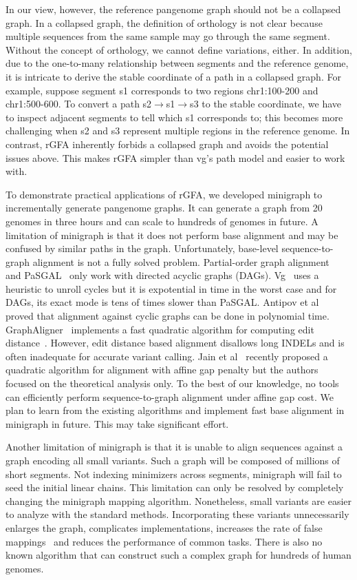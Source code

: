 \documentclass[twocolumn]{bmcart}
\begin{document}
In our view, however, the reference pangenome graph should not be a collapsed
graph. In a collapsed graph, the definition of orthology is not clear because
multiple sequences from the same sample may go through the same segment.
Without the concept of orthology, we cannot define variations, either.  In
addition, due to the one-to-many relationship between segments and the
reference genome, it is intricate to derive the stable coordinate of a path in
a collapsed graph. For example, suppose segment {\sf s1} corresponds to two
regions {\sf chr1:100-200} and {\sf chr1:500-600}. To convert a path {\sf
s2$\to$s1$\to$s3} to the stable coordinate, we have to inspect adjacent
segments to tell which {\sf s1} corresponds to; this becomes more challenging
when {\sf s2} and {\sf s3} represent multiple regions in the reference genome.
In contrast, rGFA inherently forbids a collapsed graph and avoids the potential
issues above. This makes rGFA simpler than vg's path model and easier to work
with.

To demonstrate practical applications of rGFA, we developed minigraph to
incrementally generate pangenome graphs. It can generate a graph from 20
genomes in three hours and can scale to hundreds of genomes in future. A
limitation of minigraph is that it does not perform base alignment and may be
confused by similar paths in the graph. {\color{black} Unfortunately, base-level
sequence-to-graph alignment is not a fully solved problem. Partial-order graph
alignment~\cite{Lee_2002} and PaSGAL~\cite{DBLP:conf/ipps/JainMZDA19} only work
with directed acyclic graphs (DAGs). Vg~\cite{Garrison:2018aa} uses a heuristic
to unroll cycles but it is expotential in time in the worst case and for DAGs,
its exact mode is tens of times slower than PaSGAL. Antipov et
al~\cite{Antipov:2016aa} proved that alignment against cyclic graphs can be
done in polynomial time. GraphAligner~\cite{Rautiainen810812} implements a
fast quadratic algorithm for computing edit distance~\cite{Rautiainen_2019}.
However, edit distance based alignment disallows long INDELs and is often
inadequate for accurate variant calling. Jain et al~\cite{Jain_2020} recently
proposed a quadratic algorithm for alignment with affine gap penalty but the
authors focused on the theoretical analysis only. To the best of our knowledge,
no tools can efficiently perform sequence-to-graph alignment under affine gap
cost. We plan to learn from the existing algorithms and implement fast base
alignment in minigraph in future. This may take significant effort.}

Another limitation of minigraph is
that it is unable to align sequences against a graph encoding all small variants.
Such a graph will be composed of millions of short segments. Not
indexing minimizers across segments, minigraph will fail to seed the initial
linear chains. This limitation can only be resolved by completely changing the
minigraph mapping algorithm. Nonetheless, small variants are easier to
analyze with the standard methods. Incorporating these variants unnecessarily
enlarges the graph, complicates implementations, increases the rate of false
mappings~\cite{Pritt_2018} and reduces the performance of common tasks. There
is also no known algorithm that can construct such a complex graph for hundreds
of human genomes.
\end{document}
